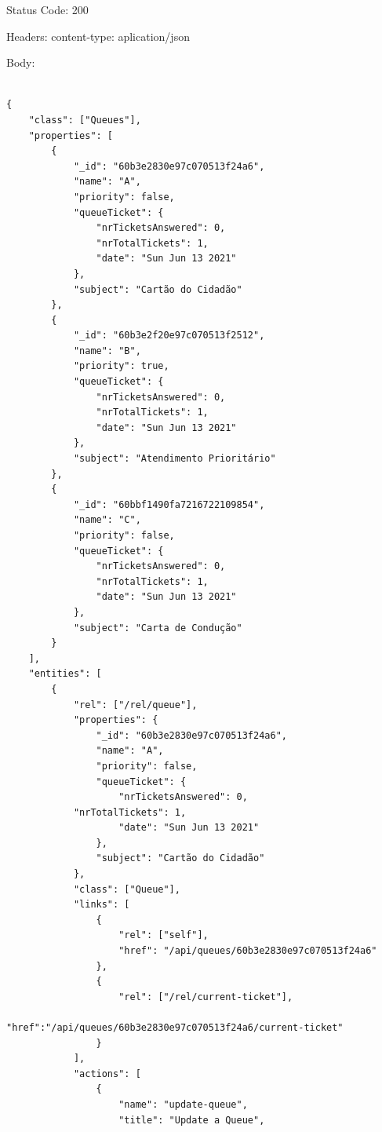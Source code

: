 \documentclass[12pt,a4paper]{article}
\begin{document}
Status Code: 200\par
Headers: content-type: aplication/json\par
Body: 
\begin{verbatim}

{    
    "class": ["Queues"],
    "properties": [        
        {             
            "_id": "60b3e2830e97c070513f24a6",
            "name": "A",
            "priority": false,
            "queueTicket": {                 
                "nrTicketsAnswered": 0,                 
                "nrTotalTickets": 1,                 
                "date": "Sun Jun 13 2021"             
            },
            "subject": "Cartão do Cidadão"         
        },
        {             
            "_id": "60b3e2f20e97c070513f2512",             
            "name": "B",
            "priority": true,
            "queueTicket": {
                "nrTicketsAnswered": 0,                 
                "nrTotalTickets": 1,
                "date": "Sun Jun 13 2021"             
            },
            "subject": "Atendimento Prioritário"
        },
        {
            "_id": "60bbf1490fa7216722109854",
            "name": "C",
            "priority": false,
            "queueTicket": {
                "nrTicketsAnswered": 0,
                "nrTotalTickets": 1,
                "date": "Sun Jun 13 2021"
            },
            "subject": "Carta de Condução"
        }     
    ],    
    "entities": [                      
        {
            "rel": ["/rel/queue"],
            "properties": {
                "_id": "60b3e2830e97c070513f24a6",                     
                "name": "A",
                "priority": false,
                "queueTicket": {
                    "nrTicketsAnswered": 0,                        
		    "nrTotalTickets": 1,
                    "date": "Sun Jun 13 2021"                     
                },                     
                "subject": "Cartão do Cidadão"                
            },
            "class": ["Queue"],
            "links": [
                {
                    "rel": ["self"],
                    "href": "/api/queues/60b3e2830e97c070513f24a6"      
                },
                {
                    "rel": ["/rel/current-ticket"],                       
                    "href":"/api/queues/60b3e2830e97c070513f24a6/current-ticket"
                }                 
            ],
            "actions": [                     
                {                         
                    "name": "update-queue",
                    "title": "Update a Queue",

\end{verbatim}
\end{document}
